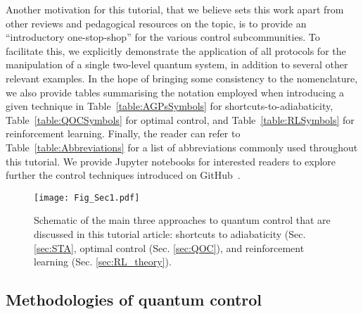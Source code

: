 Another motivation for this tutorial, that we believe sets this work apart from other reviews and pedagogical resources on the topic, is to provide an ``introductory one-stop-shop'' for the various control subcommunities. To facilitate this, we explicitly demonstrate the application of all protocols for the manipulation of a single two-level quantum system, in addition to several other relevant examples.  In the hope of bringing some consistency to the nomenclature, we also provide tables summarising the notation employed when introducing a given technique in Table~\ref{table:AGPsSymbols} for shortcuts-to-adiabaticity, Table~\ref{table:QOCSymbols} for optimal control, and Table~\ref{table:RLSymbols} for reinforcement learning. Finally, the reader can refer to Table~\ref{table:Abbreviations} for a list of abbreviations commonly used throughout this tutorial.
We provide Jupyter notebooks for interested readers to explore further the control techniques introduced on GitHub~\cite{github_code}.

\begin{figure}[t]
\texttt{[image: Fig\_Sec1.pdf]}
\label{fig:scope}
\caption{Schematic of the main three approaches to quantum control that are discussed in this tutorial article: shortcuts to adiabaticity (Sec. \ref{sec:STA}, optimal control (Sec. \ref{sec:QOC}), and reinforcement learning (Sec. \ref{sec:RL_theory}). }
\end{figure}

\subsection{Methodologies of quantum control}

